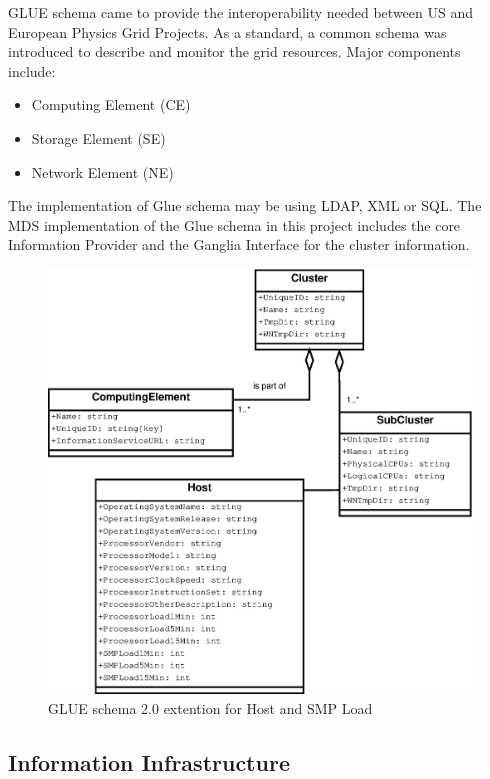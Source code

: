 GLUE schema came to provide the interoperability needed between US and European Physics Grid Projects. As a standard, a common schema was introduced to describe and monitor the grid resources. Major components include:

\begin{itemize}
\item Computing Element (CE)
\item Storage Element (SE)
\item Network Element (NE)
\end{itemize}

The implementation of Glue schema may be using LDAP, XML or SQL. The MDS implementation of the Glue schema in this project includes the core Information Provider and the Ganglia Interface for the cluster information.


\begin{figure}[htb]
\centering
 \includegraphics[width=130mm]{images/gluece_ext.eps}
\caption{GLUE schema 2.0 extention for Host and SMP Load}
\label{figure:gluece_ext}
\end{figure}


\subsection{Information Infrastructure}

